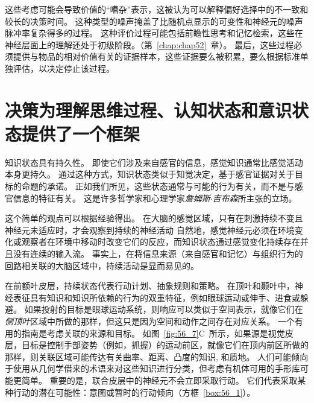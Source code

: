 这些考虑可能会导致价值的“嘈杂”表示，这被认为可以解释偏好选择中的不一致和较长的决策时间。
这种类型的噪声掩盖了比随机点显示的可变性和神经元的噪声脉冲率复杂得多的过程。
这种评价过程可能包括前瞻性思考和记忆检索，这些在神经层面上的理解还处于初级阶段。（第~\ref{chap:chap52}~章）。
最后，这些过程必须提供与物品的相对价值有关的证据样本，这些证据要么被积累，要么根据标准单独评估，以决定停止该过程。



\section{决策为理解思维过程、认知状态和意识状态提供了一个框架}

知识状态具有持久性。 即使它们涉及来自感官的信息，感觉知识通常比感觉活动本身更持久。
通过这种方式，知识状态类似于知觉决定，基于感官证据对关于目标的命题的承诺。
正如我们所见，这些状态通常与可能的行为有关，而不是与感官信息的特征有关。
这是许多哲学家和心理学家\textit{詹姆斯$\cdot$吉布森}所主张的立场。


这个简单的观点可以根据经验得出。
在大脑的感觉区域，只有在刺激持续不变且神经元未适应时，才会观察到持续的神经活动
自然地，感觉神经元必须在环境变化或观察者在环境中移动时改变它们的反应，而知识状态通过感觉变化持续存在并且没有连续的输入流。
事实上，在将信息来源（来自感官和记忆）与组织行为的回路相关联的大脑区域中，持续活动是显而易见的。


在前额叶皮层，持续状态代表行动计划、抽象规则和策略。
在顶叶和颞叶中，神经表征具有知识和知识所依赖的行为的双重特征，例如眼球运动或伸手、进食或躲避。
如果投射的目标是眼球运动系统，则响应可以类似于空间表示，就像它们在\textit{侧顶叶}区域中所做的那样，但这只是因为空间和动作之间存在对应关系。
一个有用的指南是考虑关联的来源和目标。
如图~\ref{fig:56_7}C~所示，如果源是视觉皮层，目标是控制手部姿势（例如，抓握）的运动前区，就像它们在顶内前区所做的那样，则关联区域可能传达有关曲率、距离、凸度的知识, 和质地。
人们可能倾向于使用从几何学借来的术语来对这些知识进行分类，但考虑有机体可用的手形库可能更简单。
重要的是，联合皮层中的神经元不会立即采取行动。
它们代表采取某种行动的潜在可能性：意图或暂时的行动倾向（方框~\ref{box:56_1}）。


